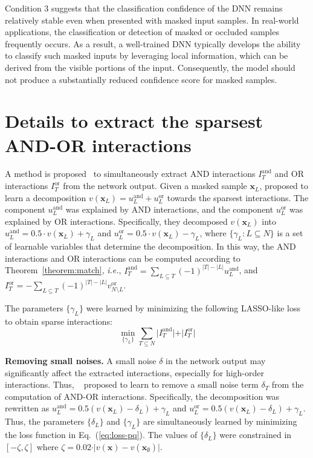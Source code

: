 \documentclass[10pt,twocolumn,letterpaper]{article}
\begin{document}
Condition 3 suggests that the classification confidence of the DNN remains relatively stable even when presented with masked input samples. In real-world applications, the classification or detection of masked or occluded samples frequently occurs. As a result, a well-trained DNN typically develops the ability to classify such masked inputs by leveraging local information, which can be derived from the visible portions of the input. Consequently, the model should not produce a substantially reduced confidence score for masked samples.




\section{Details to extract the sparsest AND-OR interactions}
\label{sec:apdx-optimize-pq}

A method is proposed~\cite{li2023defining, chen2024defining} to simultaneously extract AND interactions $I^{\text{and}}_T$ and OR interactions $I^{\text{or}}_T$ from the network output. Given a masked sample $\mathbf{x}_L$, \cite{li2023defining} proposed to learn a decomposition $v(\mathbf{x}_L)=u^{\text{and}}_L + u^{\text{or}}_L$ towards the sparsest interactions.
The component {$u^{\text{and}}_L$} was explained by AND interactions, and the component {$u^{\text{or}}_L$} was explained by OR interactions.
Specifically, they decomposed $v(\mathbf{x}_L)$ into $u^{\text{and}}_L= 0.5 \cdot v(\mathbf{x}_L)+\gamma_L$ and $u^{\text{or}}_L= 0.5 \cdot v(\mathbf{x}_L) -\gamma_L$, where $\{\gamma_L:L\subseteq N\}$ is a set of learnable variables that determine the decomposition. In this way, the AND interactions and OR interactions can be computed according to Theorem~\ref{theorem:match}, \textit{i.e.}, $I^{\text{and}}_T=\sum\nolimits_{L \subseteq T}(-1)^{|T|-|L|} u^{\text{and}}_L$, and  $I^{\text{or}}_T=-\sum\nolimits_{L \subseteq T}(-1)^{|T|-|L|} v^{\text{or}}_{N \setminus L}$.

The parameters $\{\gamma_L\}$ were learned by minimizing the following LASSO-like loss to obtain sparse interactions:
\begin{equation}
\label{eq:loss-pq}
    \min_{\{\gamma_L\}} \sum_{T\subseteq N} \vert I^{\text{and}}_T \vert + \vert I^{\text{or}}_T \vert
\end{equation}

\textbf{Removing small noises.} A small noise $\delta$ in the network output may significantly affect the extracted interactions, especially for high-order interactions. Thus, ~\cite{li2023defining} proposed to learn to remove a small noise term $\delta_T$ from the computation of AND-OR interactions.
Specifically, the decomposition was rewritten as {$u^{\text{and}}_L=0.5 (v(\mathbf{x}_L) -\delta_L) +\gamma_L$} and {$u^{\text{or}}_L=0.5 (v(\mathbf{x}_L)-\delta_L) +\gamma_L$}.
Thus, the parameters {$\{\delta_L\}$} and {$\{\gamma_L\}$} are simultaneously learned by minimizing the loss function in Eq.~(\ref{eq:loss-pq}).
The values of {$\{\delta_L\}$} were constrained in $[-\zeta, \zeta]$ where {$\zeta=0.02\cdot \vert v(\mathbf{x})-v(\mathbf{x}_\emptyset) \vert$}.
\end{document}
